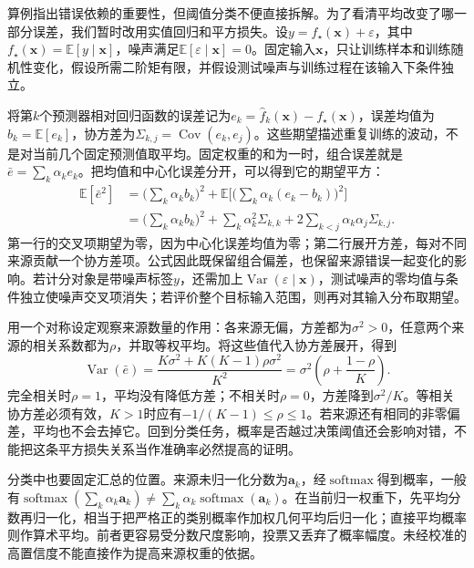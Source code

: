 算例指出错误依赖的重要性，但阈值分类不便直接拆解。为了看清平均改变了哪一部分误差，我们暂时改用实值回归和平方损失。设$y=f_\star(\bm{x})+\varepsilon$，其中$f_\star(\bm{x})=\mathbb{E}[y\mid\bm{x}]$，噪声满足$\mathbb{E}[\varepsilon\mid\bm{x}]=0$。固定输入$\bm{x}$，只让训练样本和训练随机性变化，假设所需二阶矩有限，并假设测试噪声与训练过程在该输入下条件独立。

将第$k$个预测器相对回归函数的误差记为$e_k=\hat f_k(\bm{x})-f_\star(\bm{x})$，误差均值为$b_k=\mathbb{E}[e_k]$，协方差为$\Sigma_{k,j}=\operatorname{Cov}(e_k,e_j)$。这些期望描述重复训练的波动，不是对当前几个固定预测值取平均。固定权重的和为一时，组合误差就是$\bar e=\sum_k\alpha_ke_k$。把均值和中心化误差分开，可以得到它的期望平方：
\begin{equation}
  \begin{aligned}
    \mathbb{E}[\bar e^2]
    &=\biggl(\sum_k\alpha_k b_k\biggr)^2+
      \mathbb{E}\biggl[\biggl(\sum_k\alpha_k(e_k-b_k)\biggr)^2\biggr]\\
    &=\biggl(\sum_k\alpha_k b_k\biggr)^2+
      \sum_k\alpha_k^2\Sigma_{k,k}
      +2\sum_{k<j}\alpha_k\alpha_j\Sigma_{k,j}.
  \end{aligned}
  \label{eq:ket-integration-bias-covariance}
\end{equation}
第一行的交叉项期望为零，因为中心化误差均值为零；第二行展开方差，每对不同来源贡献一个协方差项。公式因此既保留组合偏差，也保留来源错误一起变化的影响。若计分对象是带噪声标签$y$，还需加上$\operatorname{Var}(\varepsilon\mid\bm{x})$，测试噪声的零均值与条件独立使噪声交叉项消失；若评价整个目标输入范围，则再对其输入分布取期望。

用一个对称设定观察来源数量的作用：各来源无偏，方差都为$\sigma^2>0$，任意两个来源的相关系数都为$\rho$，并取等权平均。将这些值代入协方差展开，得到
\begin{equation}
  \operatorname{Var}(\bar e)
  =\frac{K\sigma^2+K(K-1)\rho\sigma^2}{K^2}
  =\sigma^2\left(\rho+\frac{1-\rho}{K}\right).
  \label{eq:ket-integration-equal-correlation}
\end{equation}
完全相关时$\rho=1$，平均没有降低方差；不相关时$\rho=0$，方差降到$\sigma^2/K$。等相关协方差必须有效，$K>1$时应有$-1/(K-1)\leq\rho\leq1$。若来源还有相同的非零偏差，平均也不会去掉它。回到分类任务，概率是否越过决策阈值还会影响对错，不能把这条平方损失关系当作准确率必然提高的证明。

分类中也要固定汇总的位置。来源未归一化分数为$\bm{a}_k$，经$\operatorname{softmax}$得到概率，一般有$\operatorname{softmax}(\sum_k\alpha_k\bm{a}_k)\neq\sum_k\alpha_k\operatorname{softmax}(\bm{a}_k)$。在当前归一权重下，先平均分数再归一化，相当于把严格正的类别概率作加权几何平均后归一化；直接平均概率则作算术平均。前者更容易受分数尺度影响，投票又丢弃了概率幅度。未经校准的高置信度不能直接作为提高来源权重的依据。

